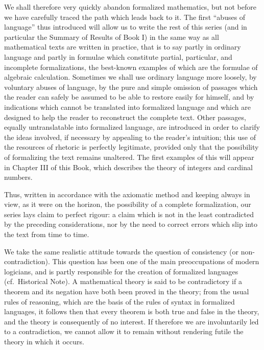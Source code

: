 We shall therefore very quickly abandon formalized mathematics, but not before we have carefully traced the path which leads back to it. The first ``abuses of language'' thus introduced will allow us to write the rest of this series (and in particular the Summary of Results of Book I) in the same way as all mathematical texts are written in practice, that is to say partly in ordinary language and partly in formulae which constitute partial, particular, and incomplete formalizations, the best-known examples of which are the formulae of algebraic calculation. Sometimes we shall use ordinary language more loosely, by voluntary abuses of language, by the pure and simple omission of passages which the reader can safely be assumed to be able to restore easily for himself, and by indications which cannot be translated into formalized language and which are designed to help the reader to reconstruct the complete text. Other passages, equally untranslatable into formalized language, are introduced in order to clarify the ideas involved, if necessary by appealing to the reader's intuition; this use of the resources of rhetoric is perfectly legitimate, provided only that the possibility of formalizing the text remains unaltered. The first examples of this will appear in Chapter III of this Book, which describes the theory of integers and cardinal numbers.

Thus, written in accordance with the axiomatic method and keeping always in view, as it were on the horizon, the possibility of a complete formalization, our series lays claim to perfect rigour: a claim which is not in the least contradicted by the preceding considerations, nor by the need to correct errors which slip into the text from time to time.

We take the same realistic attitude towards the question of consistency (or non-contradiction). This question has been one of the main preoccupations of modern logicians, and is partly responsible for the creation of formalized languages (cf.~Historical Note). A mathematical theory is said to be contradictory if a theorem and its negation have both been proved in the theory; from the usual rules of reasoning, which are the basis of the rules of syntax in formalized languages, it follows then that every theorem is both true and false in the theory, and the theory is consequently of no interest. If therefore we are involuntarily led to a contradiction, we cannot allow it to remain without rendering futile the theory in which it occurs.

